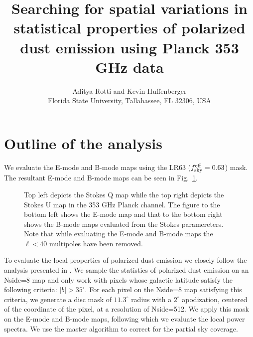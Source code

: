 \documentclass[12pt]{article}
\begin{document}
\title{Searching for spatial variations in statistical properties of polarized dust emission using Planck 353 GHz data}
\author{Aditya Rotti and Kevin Huffenberger \\ Florida State University, Tallahassee, FL 32306, USA}
\maketitle


\newpage
\section{Outline of the analysis}
We evaluate the E-mode and B-mode maps using the LR63 ($f_{\rm sky}^{\rm eff}=0.63$) mask. The resultant E-mode and B-mode maps can be seen in Fig.~\ref{fig:ebmaps}.
\begin{figure}[!h]
\centering
{}
\caption{Top left depicts the Stokes Q map while the top right depicts the Stokes U map in the 353 GHz Planck channel. The figure to the bottom left shows the E-mode map and that to the bottom right shows the B-mode maps evaluated from the Stokes paramereters. Note that while evaluating the E-mode and B-mode maps the $\ell < 40$ multipoles have been removed.}
\label{fig:ebmaps}
\end{figure}

To evaluate the local properties of polarized dust emission we closely follow the analysis presented in \cite{pip-xxx}. We sample the statistics of polarized dust emission on an Nside=8 map and only work with pixels whose galactic latitude satisfy the following criteria: $|b|>35^{\circ}$. For each pixel on the Nside=8 map satisfying this criteria, we generate a disc mask of $11.3^{\circ}$ radius with a $2^{\circ}$ apodization, centered of the coordinate of the pixel, at a resolution of Nside=512. We apply this mask on the E-mode and B-mode maps, following which we evaluate the local power spectra. We use the master algorithm to correct for the partial sky coverage. 
\end{document}
